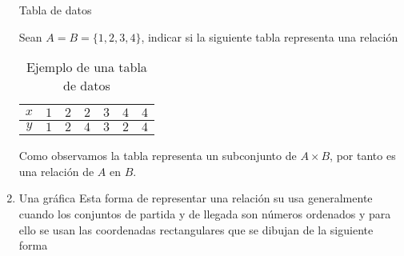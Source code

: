 \begin{enumerate}
\begin{table}[H]
\caption{Tabla de datos}
\end{table}
\begin{ejemplo} Sean $A=B=\{1,2,3,4\}$, indicar si la siguiente
tabla representa una relación
\begin{table}[H]
\centering%
\begin{tabular}{|c|c|c|c|c|c|c|}
\hline 
$x$ &
$1$ &
$2$ &
$2$ &
$3$ &
$4$ &
$4$\tabularnewline
\hline 
\hline 
$y$ &
$1$ &
$2$ &
$4$ &
$3$ &
$2$ &
$4$\tabularnewline
\hline 
\end{tabular}

\caption{Ejemplo de una tabla de datos}
\end{table}
\end{ejemplo}Como observamos la tabla representa un subconjunto de
$A\times B$, por tanto es una relación de $A$ en $B.$
\item Una gráfica\medskip{}
Esta forma de representar una relación su usa generalmente cuando
los conjuntos de partida y de llegada son números ordenados y para
ello se usan las coordenadas rectangulares que se dibujan de la siguiente
forma 


\end{enumerate}
